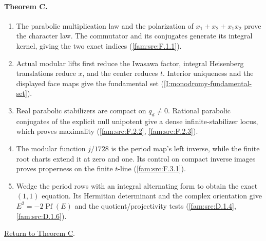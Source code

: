 \paragraph{Theorem C.}
\begin{enumerate}[label=\arabic*.]
\item\hypertarget{step-I-C-1}{} The parabolic multiplication law
and the polarization of $x_1+x_2+x_1x_2$ prove the character law.
The commutator and its conjugates generate its integral kernel,
giving the two exact indices
(\hyperref[fam:src:F.1.1]{\ref*{fam:src:F.1.1}}).
\item\hypertarget{step-I-C-2}{} Actual modular lifts first reduce
the Iwasawa factor, integral Heisenberg translations reduce $x$,
and the center reduces $t$.  Interior uniqueness and the displayed
face maps give the fundamental set
(\hyperref[I:monodromy-fundamental-set]{\ref*{I:monodromy-fundamental-set}}).
\item\hypertarget{step-I-C-3}{} Real parabolic stabilizers are
compact on $q_d\ne0$.  Rational parabolic conjugates of the
explicit null unipotent give a dense infinite-stabilizer locus,
which proves maximality
(\hyperref[fam:src:F.2.2]{\ref*{fam:src:F.2.2}},
\hyperref[fam:src:F.2.3]{\ref*{fam:src:F.2.3}}).
\item\hypertarget{step-I-C-4}{} The modular function $j/1728$
is the period map's left inverse, while the finite root charts
extend it at zero and one.  Its control on compact inverse
images proves properness on the finite $t$-line
(\hyperref[fam:src:F.3.1]{\ref*{fam:src:F.3.1}}).
\item\hypertarget{step-I-C-5}{} Wedge the period rows with an
integral alternating form to obtain the exact $(1,1)$ equation.
Its Hermitian determinant and the complex orientation give
$E^2=-2\operatorname{Pf}(E)$ and the quotient/projectivity tests
(\hyperref[fam:src:D.1.4]{\ref*{fam:src:D.1.4}},
\hyperref[fam:src:D.1.6]{\ref*{fam:src:D.1.6}}).
\end{enumerate}
\hyperlink{main-I-C}{Return to Theorem C}.

\hypertarget{outline-I-D}{}
